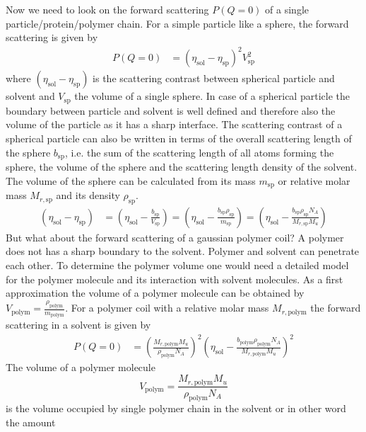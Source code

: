 Now we need to look on the forward scattering $P(Q\mbox{$=$}0)$ of a single particle/protein/polymer chain.
For a simple particle like a sphere, the forward scattering is given by
\begin{align}
P(Q\mbox{$=$}0) &= \left(\eta_\mathrm{sol}-\eta_\mathrm{sp}\right)^2 V_\mathrm{sp}^2
\end{align}
where $\left(\eta_\mathrm{sol}-\eta_\mathrm{sp}\right)$ is the scattering contrast between
spherical particle and solvent and $V_\mathrm{sp}$ the volume of a single sphere. In case of a spherical
particle the boundary between particle and solvent is well defined and therefore also the volume of the particle
as it has a sharp interface. The scattering contrast of a spherical particle
can also be written in terms of the overall scattering length of the sphere $b_\mathrm{sp}$,
i.e. the sum of the scattering length of all atoms forming the sphere,
the volume of the sphere and the scattering length density of the solvent.
The volume of the sphere can be calculated from its mass $m_\mathrm{sp}$ or
relative molar mass $M_{r,\mathrm{sp}}$
and its density $\rho_\mathrm{sp}$.
\begin{align}
\left(\eta_\mathrm{sol}-\eta_\mathrm{sp}\right)
&= \left(\eta_\mathrm{sol}-\frac{b_\mathrm{sp}}{V_\mathrm{sp}}\right)
 = \left(\eta_\mathrm{sol}-\frac{b_\mathrm{sp} \rho_\mathrm{sp}}{m_\mathrm{sp}}\right)
 = \left(\eta_\mathrm{sol}-\frac{b_\mathrm{sp} \rho_\mathrm{sp} N_A}{M_{r,\mathrm{sp}}M_u}\right)
\end{align}
But what about the forward scattering of a gaussian polymer coil? A polymer does not has a sharp boundary
to the solvent. Polymer and solvent can penetrate each other. To determine the polymer volume one would need
a detailed model for the polymer molecule and its interaction with solvent molecules.
As a first approximation the volume of a polymer molecule can be obtained by
$V_\mathrm{polym}=\frac{\rho_\mathrm{polym}}{m_\mathrm{polym}}$.
For a polymer coil with a relative molar mass $M_{r,\mathrm{polym}}$ the forward scattering in a solvent is given by
\begin{align}
P(Q\mbox{$=$}0)
&= \left(\frac{M_{r,\mathrm{polym}}M_u}{\rho_\mathrm{polym} N_A}\right)^2
\left(\eta_\mathrm{sol}-\frac{b_\mathrm{polym} \rho_\mathrm{polym} N_A}{M_{r,\mathrm{polym}}M_u}\right)^2
\end{align}
The  volume of a polymer molecule
\[
V_\mathrm{polym} = \frac{M_{r,\mathrm{polym}}M_u}{\rho_\mathrm{polym} N_A}
\]
is the volume occupied by single polymer chain in the solvent or in other word the amount
